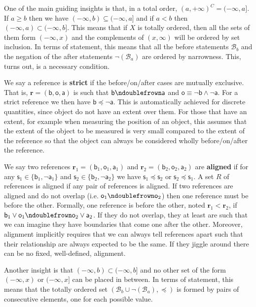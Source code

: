 \documentclass{article}
\def\AND{\wedge}
\def\OR{\vee}
\def\NOT{\neg}
\newcommand{\stmt}[1][s] {\mathsf{#1}} %
\def\ncomp{\ndoublefrown}
\def\narrower{\preccurlyeq} %
\newcommand{\basis}[1][B] {\mathcal{#1}} %
\newcommand{\refStmt}[1][r]{\textbf{#1}}
\begin{document}
One of the main guiding insights is that, in a total order, $(a, +\infty) ^C = (-\infty, a]$. If $a \geq b$ then we have $(-\infty, b) \subseteq (-\infty, a]$ and if $a < b$ then $(-\infty, a) \subset (-\infty, b]$. This means that if $X$ is totally ordered, then all the sets of them form $(-\infty, x)$ and the complements of $(x, \infty)$ will be ordered by set inclusion. In terms of statement, this means that all the before statements $\basis_b$ and the negation of the after statements $\NOT(\basis_a)$ are ordered by narrowness. This, turns out, is a necessary condition.

We say a reference is \textbf{strict} if the before/on/after cases are mutually exclusive. That is, $\refStmt = (\stmt[b], \stmt[o], \stmt[a])$ is such that $\stmt[b] \ncomp \stmt[a]$ and $\stmt[o] \equiv \NOT \stmt[b] \AND \NOT \stmt[a]$. For a strict reference we then have $\stmt[b] \narrower \NOT \stmt[a]$. This is automatically achieved for discrete quantities, since object do not have an extent over them. For those that have an extent, for example when measuring the position of an object, this assumes that the extent of the object to be measured is very small compared to the extent of the reference so that the object can always be considered wholly before/on/after the reference.

We say two references $\refStmt_1 = (\stmt[b]_1, \stmt[o]_1, \stmt[a]_1)$ and $\refStmt_2 = (\stmt[b]_2, \stmt[o]_2, \stmt[a]_2)$ are \textbf{aligned} if for any $\stmt_1 \in \{ \stmt[b]_1, \NOT\stmt[a]_1\}$ and $\stmt_2 \in \{ \stmt[b]_2, \NOT\stmt[a]_2\}$ we have 
$\stmt_1 \narrower \stmt_2$ or $\stmt_2 \narrower \stmt_1$. A set $R$ of references is aligned if any pair of references is aligned. If two references are aligned and do not overlap (i.e. $\stmt[o]_1 \ncomp \stmt[o]_2$) then one reference must be before the other. Formally, one reference is before the other, noted $\refStmt_1 \less \refStmt_2$, if $\stmt[b]_1 \OR \stmt[o]_1 \ncomp \stmt[o]_2 \OR \stmt[a]_2$. If they do not overlap, they at least are such that we can imagine they have boundaries that come one after the other. Moreover, alignment implicitly requires that we can always tell references apart such that their relationship are always expected to be the same. If they jiggle around there can be no fixed, well-defined, alignment.

Another insight is that $(-\infty, b) \subset (-\infty, b]$ and no other set of the form $(-\infty, x)$ or $(-\infty, x]$ can be placed in between. In terms of statement, this means that the totally ordered set $( \basis_b \cup \NOT(\basis_a), \narrower)$ is formed by pairs of consecutive elements, one for each possible value.
\end{document}
